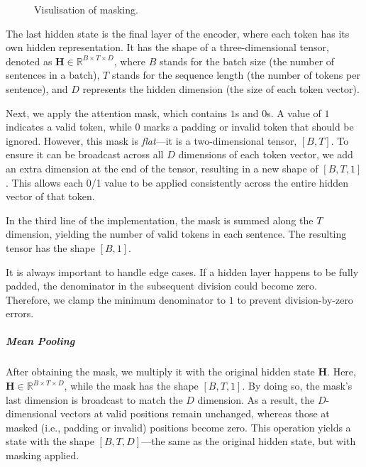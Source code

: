 \documentclass[12pt]{article}
\begin{document}
\begin{figure}[H]
\caption{Visulisation of masking.}
\end{figure}

The last hidden state is the final layer of the encoder, where each token has its own hidden representation. 
It has the shape of a three-dimensional tensor, denoted as $\mathbf{H} \in \mathbb{R}^{B \times T \times D}$, 
where $B$ stands for the batch size (the number of sentences in a batch), 
$T$ stands for the sequence length (the number of tokens per sentence), 
and $D$ represents the hidden dimension (the size of each token vector).

Next, we apply the attention mask, which contains $1$s and $0$s. 
A value of $1$ indicates a valid token, while $0$ marks a padding or invalid token that should be ignored. 
However, this mask is \textit{flat}\;---\;it is a two-dimensional tensor, $[B, T]$. 
To ensure it can be broadcast across all $D$ dimensions of each token vector, 
we add an extra dimension at the end of the tensor, resulting in a new shape of $[B, T, 1]$. 
This allows each 0/1 value to be applied consistently across the entire hidden vector of that token.

In the third line of the implementation, the mask is summed along the $T$ dimension, 
yielding the number of valid tokens in each sentence. 
The resulting tensor has the shape $[B, 1]$.

It is always important to handle edge cases. 
If a hidden layer happens to be fully padded, the denominator in the subsequent division could become zero. 
Therefore, we clamp the minimum denominator to $1$ to prevent division-by-zero errors.

\subparagraph{Mean Pooling}
After obtaining the mask, we multiply it with the original hidden state $\mathbf{H}$. 
Here, $\mathbf{H} \in \mathbb{R}^{B \times T \times D}$, while the mask has the shape $[B, T, 1]$. 
By doing so, the mask's last dimension is broadcast to match the $D$ dimension. 
As a result, the $D$-dimensional vectors at valid positions remain unchanged, whereas those at masked (i.e., padding or invalid) positions become zero. 
This operation yields a state with the shape $[B, T, D]$\;---\;the same as the original hidden state, but with masking applied.
\end{document}
